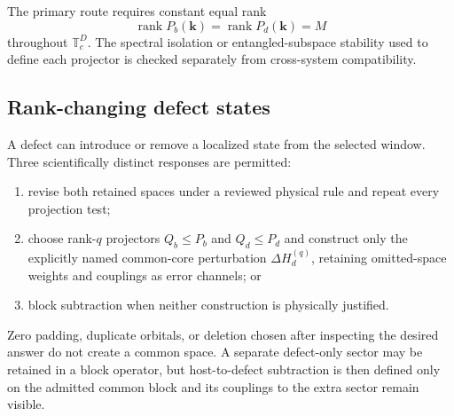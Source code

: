 \documentclass[11pt]{article}
\newenvironment{prospective}{\color{prospectivered}}{}
\begin{document}
\begin{prospective}
The primary route requires constant equal rank
\begin{equation}
 \operatorname{rank}P_b(\mathbf k)=\operatorname{rank}P_d(\mathbf k)=M
\end{equation}
throughout $\mathbb T_c^D$. The spectral isolation or entangled-subspace stability used
to define each projector is checked separately from cross-system compatibility.

\subsection{Rank-changing defect states}
A defect can introduce or remove a localized state from the selected window. Three
scientifically distinct responses are permitted:
\begin{enumerate}
 \item revise both retained spaces under a reviewed physical rule and repeat every
 projection test;
 \item choose rank-$q$ projectors $Q_b\le P_b$ and $Q_d\le P_d$ and construct only the
 explicitly named common-core perturbation $\Delta H_d^{(q)}$, retaining omitted-space
 weights and couplings as error channels; or
 \item block subtraction when neither construction is physically justified.
\end{enumerate}
Zero padding, duplicate orbitals, or deletion chosen after inspecting the desired answer
do not create a common space. A separate defect-only sector may be retained in a block
operator, but host-to-defect subtraction is then defined only on the admitted common
block and its couplings to the extra sector remain visible.


\end{prospective}
\end{document}
